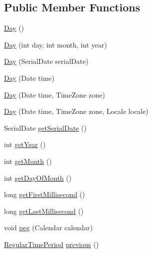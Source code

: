 \subsection*{Public Member Functions}
\begin{DoxyCompactItemize}
\item 
\mbox{\hyperlink{classorg_1_1jfree_1_1data_1_1time_1_1_day_a4cc7fdf2720032a2f3e489e3617655eb}{Day}} ()
\item 
\mbox{\hyperlink{classorg_1_1jfree_1_1data_1_1time_1_1_day_a01033e430d108c4f00ce9d265b7d05f6}{Day}} (int day, int month, int year)
\item 
\mbox{\hyperlink{classorg_1_1jfree_1_1data_1_1time_1_1_day_a90ada1bf6d62e90fe3a2caf9c8d20f7e}{Day}} (Serial\+Date serial\+Date)
\item 
\mbox{\hyperlink{classorg_1_1jfree_1_1data_1_1time_1_1_day_ac127c65af81e8ad3b54abed4af3a55d1}{Day}} (Date time)
\item 
\mbox{\hyperlink{classorg_1_1jfree_1_1data_1_1time_1_1_day_a3ced8a3a743c15f823e76d31c14de2cf}{Day}} (Date time, Time\+Zone zone)
\item 
\mbox{\hyperlink{classorg_1_1jfree_1_1data_1_1time_1_1_day_afe9e9ec45889b03e97a9b64a3f126cc9}{Day}} (Date time, Time\+Zone zone, Locale locale)
\item 
Serial\+Date \mbox{\hyperlink{classorg_1_1jfree_1_1data_1_1time_1_1_day_ac0ef35d82e39618743da8e898ef401d0}{get\+Serial\+Date}} ()
\item 
int \mbox{\hyperlink{classorg_1_1jfree_1_1data_1_1time_1_1_day_a64d1004dbdd56010b7563048a069015a}{get\+Year}} ()
\item 
int \mbox{\hyperlink{classorg_1_1jfree_1_1data_1_1time_1_1_day_a3c9bed548d3c21a2db9e2bf8f6b44539}{get\+Month}} ()
\item 
int \mbox{\hyperlink{classorg_1_1jfree_1_1data_1_1time_1_1_day_a0ef57f9f261fcb51f130323617c735b3}{get\+Day\+Of\+Month}} ()
\item 
long \mbox{\hyperlink{classorg_1_1jfree_1_1data_1_1time_1_1_day_a749a1d827eea6ad8374db0746d87e30b}{get\+First\+Millisecond}} ()
\item 
long \mbox{\hyperlink{classorg_1_1jfree_1_1data_1_1time_1_1_day_ac4c355e60db625a16590787e50c96800}{get\+Last\+Millisecond}} ()
\item 
void \mbox{\hyperlink{classorg_1_1jfree_1_1data_1_1time_1_1_day_aec3e06803aa5e7984df40e3d90ae67d5}{peg}} (Calendar calendar)
\item 
\mbox{\hyperlink{classorg_1_1jfree_1_1data_1_1time_1_1_regular_time_period}{Regular\+Time\+Period}} \mbox{\hyperlink{classorg_1_1jfree_1_1data_1_1time_1_1_day_ac7215f679acece03af9cf38b3bf11213}{previous}} ()

\end{DoxyCompactItemize}
